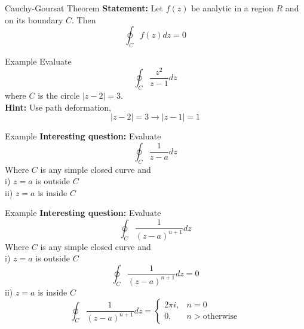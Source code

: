 \documentclass[11pt]{beamer}
\theoremstyle{plain}
\begin{document}


\begin{frame}{Cauchy-Goursat Theorem}
    \textbf{Statement:} Let $f(z)$ be analytic in a region $R$ and on its boundary $C$. Then $$\oint_C f(z) dz=0$$
\end{frame}

\begin{frame}{Example}
    Evaluate $$\oint_C \frac{z^2}{z-1}dz$$
    where $C$ is the circle $|z-2|=3$.\\
    \textbf{Hint:} Use path deformation, $$|z-2|=3\rightarrow |z-1|=1$$ 
\end{frame}

\begin{frame}{Example}
\textbf{Interesting question:}
    Evaluate
$$
\oint_C \frac{1}{z-a} d z
$$
Where $C$ is any simple closed curve and\\
i) $z=a$ is outside $C$\\
ii) $z=a$ is inside $C$
\end{frame}

\begin{frame}{Example}
\textbf{Interesting question:}
    Evaluate
$$
\oint_C \frac{1}{(z-a)^{n+1}} d z
$$
Where $C$ is any simple closed curve and\\
i) $z=a$ is outside $C$\\
$$\oint_C \frac{1}{(z-a)^{n+1}} d z=0$$
ii) $z=a$ is inside $C$
$$
\oint_C \frac{1}{(z-a)^{n+1}} d z=\begin{cases}
    2\pi i,&n=0\\
    0,&n> \text{otherwise}
\end{cases}
$$
\end{frame}


\end{document}
